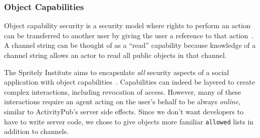 
\subsubsection{Object Capabilities}

Object capability security is a security model where rights to perform an action
can be transferred to another user by giving the user a reference to that action~\cite{capabilitymyths}.
A channel string can be thought of as a ``read'' capability because knowledge
of a channel string allows an actor to read all public objects in that channel.

The Spritely Institute aims to encapsulate \emph{all}
security aspects of a social application with object capabilities~\cite{spritely}.
Capabilities can indeed be layered to create complex interactions,
including revocation of access.
However, many of these interactions require an agent acting on the user's behalf
to be always \emph{online}, similar to ActivityPub's server side effects.
Since we don't want developers to have to write server code,
we chose to give objects more familiar \texttt{allowed} lists
in addition to channels.




